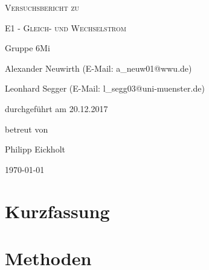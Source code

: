 \documentclass[
	a4paper,
	12pt,
	pagesize,
	ngerman
]{scrartcl}
\begin{document}
	
	\begin{titlepage}
		\centering
		{\scshape\LARGE Versuchsbericht zu \par}
		\vspace{1cm}
		{\scshape\huge E1 - Gleich- und Wechselstrom\par}
		\vspace{2.5cm}
		{\LARGE Gruppe 6Mi \par}
		\vspace{0.5cm}
		
		{\large Alexander Neuwirth (E-Mail: a\_neuw01@wwu.de) \par}
		{\large Leonhard Segger (E-Mail: l\_segg03@uni-muenster.de) \par}
		\vfill
		
		durchgeführt am 20.12.2017\par 
		betreut von\par
		{\large Philipp Eickholt} %
		
		\vfill
		
		{\large \today\par}
	\end{titlepage}
	\tableofcontents
	\newpage


	\section{Kurzfassung}
	
	\section{Methoden}
	
\end{document}
